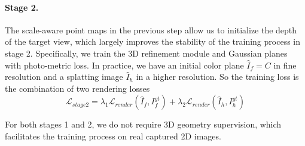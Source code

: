 \paragraph{Stage 2.} The scale-aware point maps in the previous step allow us to initialize the depth of the target view, which largely improves the stability of the training process in stage 2. Specifically, we train the 3D refinement module and Gaussian planes with photo-metric loss. In practice, we have an initial color plane $\hat{I}_f = C$ in fine resolution and a splatting image $\hat{I}_h$ in a higher resolution.
So the training loss is the combination of two rendering losses 
\begin{equation}
    \mathcal{L}_{stage2} = \lambda_1 \mathcal{L}_{render}(\hat{I}_f, I_{f}^{gt}) + \lambda_2 \mathcal{L}_{render}(\hat{I}_h, I_{h}^{gt})
    \label{eq:loss2}
\end{equation}

For both stages 1 and 2, we do not require 3D geometry supervision, which facilitates the training process on real captured 2D images.